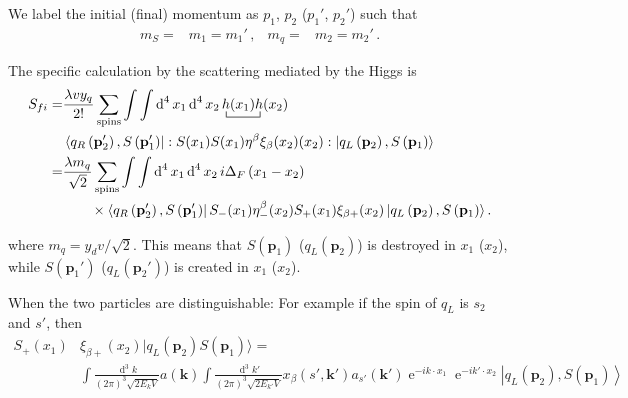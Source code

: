We label the initial (final) momentum as $p_1$, $p_2$ ($p_1'$, $p_2'$) such that
\begin{align}
  m_S=&m_1=m_1'\,,&m_q=&m_2=m_2'\,.
\end{align}


The specific calculation by the scattering mediated by the Higgs is 
\begin{align}
  \label{eq:ss32}
  S_{fi}=&\frac{\lambda  v y_q }{2!}\sum_{\text{spins}}\int\int \operatorname{d}^4x_1 \operatorname{d}^4x_2
\bcontraction{\,}{h}{(x_1)}{h}\,h(x_1)h(x_2) \nonumber\\
&\left\langle q_R \left(\mathbf{p}'_2\right),S\left(\mathbf{p}'_1\right) \right|
  : S(x_1)S(x_1)
    \eta^{\beta}\xi_{\beta}(x_2)(x_2):
 \left| q_L\left(\mathbf{p}_2\right) ,S \left(\mathbf{p}_1\right)  \right\rangle \nonumber\\
=&\frac{ \lambda  m_q }{\sqrt{2}}\sum_{\text{spins}}\int\int \operatorname{d}^4x_1 \operatorname{d}^4x_2
\,i\Delta_F \left( x_1-x_2 \right)\nonumber\\
&\qquad\times\left\langle q_R \left(\mathbf{p}'_2\right),S\left(\mathbf{p}'_1\right)\right|
   S_-(x_1)\eta^{\beta}_{-}(x_2) S_+(x_1)\xi_{\beta +}(x_2)
 \left| q_L\left(\mathbf{p}_2\right), S \left(\mathbf{p}_1\right)\right\rangle. 
\end{align}

where $m_q=y_d v/\sqrt{2}$. This means that $S(\mathbf{p}_1)$ ($q_L(\mathbf{p}_2)$) is destroyed in $x_1$ ($x_2$), while
$S(\mathbf{p}_1')$ ($q_L(\mathbf{p}_2')$) is created in $x_1$ ($x_2$).


When the two particles are distinguishable: For example if the spin of $q_L$ is $s_2$ and $s'$, then %
\begin{align}
  S_{+}(x_1)&\xi_{\beta +}(x_2)|q_L(\mathbf{p}_2)S(\mathbf{p}_1)\rangle= \nonumber\\
&\int\frac{\operatorname{d}^3k}{(2\pi)^3\sqrt{2E_k V}}a(\mathbf{k})\int\frac{\operatorname{d}^3k'}{(2\pi)^3\sqrt{2E_{k'}V}} 
           x_\beta(s',\mathbf{k}')a_{s'}(\mathbf{k}')\operatorname{e}^{-i k\cdot x_1}\operatorname{e}^{-i k'\cdot x_2} \left| q_L\left(\mathbf{p}_2\right), S \left(\mathbf{p}_1\right)\right\rangle\\ \nonumber
\end{align}

